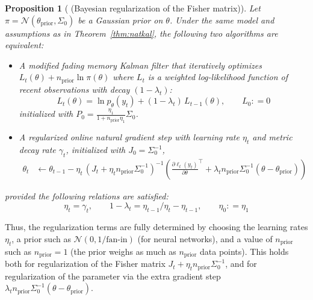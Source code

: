 \documentclass[11pt,a4paper]{article}
\newcommand{\deq}{\mathrel{\mathop{:}}=}
\newcommand{\E}{\mathbb{E}}
\newcommand{\1}{\mathbbm{1}}
\theoremstyle{yannthm}
\newtheorem{prop}[defi]{Proposition}
\theoremstyle{yannthm2}
\newcommand{\transp}[1]{#1^{\!\top}\!}
\newcommand{\gaussian}{\mathcal{N}}
\numberwithin{equation}{section}
\begin{document}
\begin{prop}[ (Bayesian regularization of the Fisher matrix)]
\label{prop:regul}
Let $\pi=\gaussian(\theta_{\mathrm{prior}},\Sigma_0)$ be a Gaussian prior on
$\theta$.
Under the same model and assumptions as in Theorem~\ref{thm:natkal},
the following two algorithms are equivalent:
\begin{itemize}
\item A modified fading memory Kalman filter that iteratively optimizes
$L_t(\theta)+n_\mathrm{prior}\ln
\pi(\theta)$ where $L_t$ is a weighted
log-likelihood function of recent observations with decay $(1-\lambda_t)$:
\begin{equation}
L_t(\theta)=\ln p_\theta(y_t)+(1-\lambda_t)\, L_{t-1}(\theta), \qquad
L_0\deq 0
\end{equation}
initialized with $P_0=\frac{\eta_1}{1+n_\mathrm{prior}\eta_1}\Sigma_0$.

\item A regularized online natural gradient step with learning rate $\eta_t$ and
metric decay rate $\gamma_t$, initialized with $J_0=\Sigma_0^{-1}$,
\begin{align}
\theta_t &\gets \theta_{t-1} -\eta_t \, \left(J_t+\eta_t n_\mathrm{prior} \Sigma_0^{-1}\right)^{-1}\left(
\transp{\frac{\partial \ell_t(y_t)}{\partial \theta}}
+\lambda_t n_\mathrm{prior} \Sigma_0^{-1}(\theta-\theta_{\mathrm{prior}})
\right)
\end{align}
\end{itemize}
provided the following relations are satisfied:
\begin{equation}
\eta_t=\gamma_t,\qquad %
1-\lambda_t=%
\eta_{t-1}/\eta_t - \eta_{t-1},\qquad \eta_0\deq \eta_1
\end{equation}
\end{prop}


Thus, the regularization terms are fully determined by choosing
the learning rates $\eta_t$, a prior such as
$\gaussian(0,1/\text{fan-in})$ (for neural networks), and a value of
$n_\mathrm{prior}$ such as $n_\mathrm{prior}=1$ (the prior weighs as much as $n_\mathrm{prior}$ data points). This holds 
both for regularization of the Fisher matrix $J_t+\eta_t n_\mathrm{prior}
\Sigma_0^{-1}$, and for regularization of the parameter via the extra
gradient step $\lambda_t
n_\mathrm{prior} \Sigma_0^{-1}(\theta-\theta_\text{prior})$.
\end{document}

